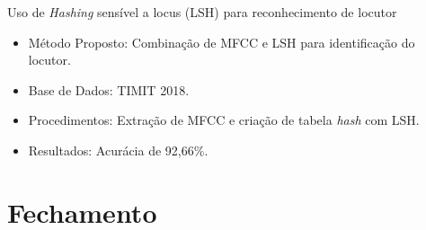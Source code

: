 \documentclass[aspectratio=169]{beamer}
\begin{document}
	\begin{frame}{Uso de \textit{Hashing} sensível a locus (LSH) para reconhecimento de locutor \cite{8396208}}
		\begin{itemize}
			\item Método Proposto: Combinação de MFCC e LSH para identificação do locutor.
			\item Base de Dados: TIMIT 2018.
			\item Procedimentos: Extração de MFCC e criação de tabela \textit{hash} com LSH.
			\item Resultados: Acurácia de 92,66\%.
		\end{itemize}
		
	\end{frame}

	\section{Fechamento}
\end{document}
